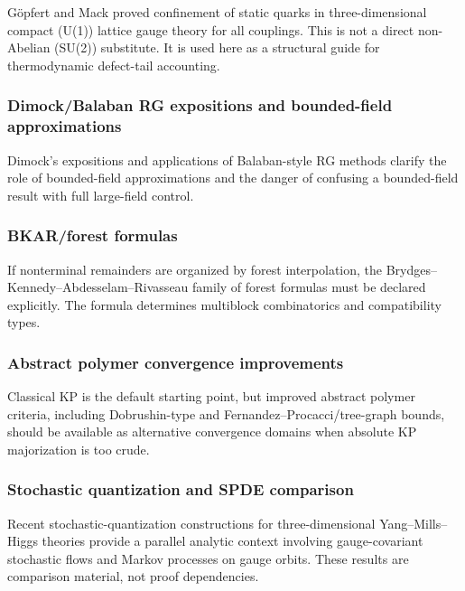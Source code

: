 \documentclass[
]{article}
\begin{document}
Göpfert and Mack proved confinement of static quarks in
three-dimensional compact (U(1)) lattice gauge theory for all couplings.
This is not a direct non-Abelian (SU(2)) substitute. It is used here as
a structural guide for thermodynamic defect-tail accounting.

\subsubsection{Dimock/Balaban RG expositions and bounded-field
approximations}\label{dimockbalaban-rg-expositions-and-bounded-field-approximations}

Dimock's expositions and applications of Balaban-style RG methods
clarify the role of bounded-field approximations and the danger of
confusing a bounded-field result with full large-field control.

\subsubsection{BKAR/forest formulas}\label{bkarforest-formulas}

If nonterminal remainders are organized by forest interpolation, the
Brydges--Kennedy--Abdesselam--Rivasseau family of forest formulas must
be declared explicitly. The formula determines multiblock combinatorics
and compatibility types.

\subsubsection{Abstract polymer convergence
improvements}\label{abstract-polymer-convergence-improvements}

Classical KP is the default starting point, but improved abstract
polymer criteria, including Dobrushin-type and
Fernandez--Procacci/tree-graph bounds, should be available as
alternative convergence domains when absolute KP majorization is too
crude.

\subsubsection{Stochastic quantization and SPDE
comparison}\label{stochastic-quantization-and-spde-comparison}

Recent stochastic-quantization constructions for three-dimensional
Yang--Mills--Higgs theories provide a parallel analytic context
involving gauge-covariant stochastic flows and Markov processes on gauge
orbits. These results are comparison material, not proof dependencies.
\end{document}
